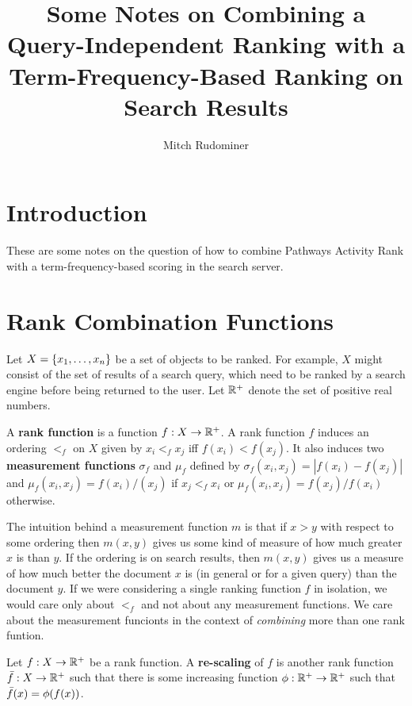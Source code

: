 \documentclass{article}
\begin{document}
\title{Some Notes on Combining a Query-Independent Ranking with a
Term-Frequency-Based Ranking on Search Results}
\author{Mitch Rudominer}

\maketitle

\section{Introduction}
These are some notes on the question of how to combine Pathways Activity Rank
with a term-frequency-based scoring in the search server.

\section{Rank Combination Functions}

Let $X = \left\{x_1,\dots,x_n\right\}$ be a set of objects to be ranked. For example,
$X$ might consist of the set of results of a search query, which need to be
ranked by a search engine before being returned to the user. Let $\mathbb{R}^{+}$ denote
the set of positive real numbers.

\begin{definition}
A \textbf{rank function} is a function $f:X\rightarrow\mathbb{R}^{+}$. A rank function $f$ induces an ordering $<_f$ on $X$ given by 
$x_i<_fx_j$ iff $f(x_i)<f(x_j)$. It also induces two \textbf{measurement functions} $\sigma_f$ and $\mu_f$ defined 
by $\sigma_f(x_i,x_j)=|f(x_i)-f(x_j)|$ and $\mu_f(x_i,x_j)=f(x_i)/(x_j)$ if
$x_j<_f x_i$  or $\mu_f(x_i,x_j)=f(x_j)/f(x_i)$ otherwise.
\end{definition}

The intuition behind a measurement function $m$ is that if $x>y$ with respect to some ordering then $m(x,y)$ gives us some kind of measure of how much greater $x$ is
 than $y$. If the ordering is on search results, then $m(x,y)$ gives us a
 measure of how much better the document $x$ is (in general or for a given
 query) than the document $y$. If we were considering a single ranking function
 $f$ in isolation, we would care only about $<_f$ and not about any measurement functions.
 We care about the measurement funcionts in the context of \emph{combining} more than one
 rank funtion.

\begin{definition}
Let $f:X\rightarrow\mathbb{R}^{+}$ be a rank function. A \textbf{re-scaling} of $f$ is another
rank function $\bar{f}:X\rightarrow\mathbb{R}^{+}$ such that there is some increasing function
$\phi:\mathbb{R}^{+}\rightarrow\mathbb{R}^{+}$ such that $\bar{f}(x)=\phi(f(x))$.
\end{definition}
\end{document}
